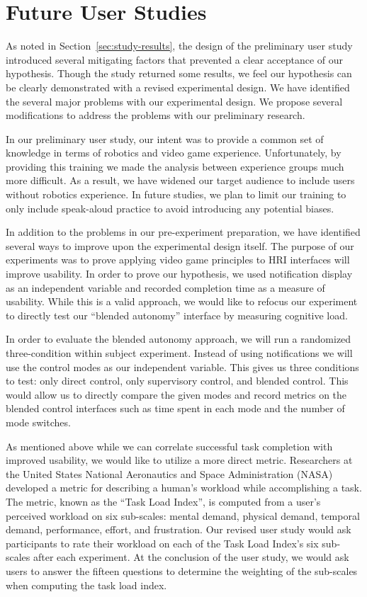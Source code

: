

\section{Future User Studies}
\label{sec:futurestudy}
As noted in Section~\ref{sec:study-results}, the design of the preliminary user study introduced several mitigating factors that prevented a clear acceptance of our hypothesis. Though the study returned some results, we feel our hypothesis can be clearly demonstrated with a revised experimental design. We have identified the several major problems with our experimental design. We propose several modifications to address the problems with our preliminary research.

In our preliminary user study, our intent was to provide a common set of knowledge in terms of robotics and video game experience. Unfortunately, by providing this training we made the analysis between experience groups much more difficult. As a result, we have widened our target audience to include users without robotics experience. In future studies, we plan to limit our training to only include speak-aloud practice to avoid introducing any potential biases.

In addition to the problems in our pre-experiment preparation, we have identified several ways to improve upon the experimental design itself. The purpose of our experiments was to prove applying video game principles to HRI interfaces will improve usability. In order to prove our hypothesis, we used notification display as an independent variable and recorded completion time as a measure of usability. While this is a valid approach, we would like to refocus our experiment to directly test our ``blended autonomy'' interface by measuring cognitive load. 

In order to evaluate the blended autonomy approach, we will run a randomized three-condition within subject experiment. Instead of using notifications we will use the control modes as our independent variable. This gives us three conditions to test: only direct control, only supervisory control, and blended control. This would allow us to directly compare the given modes and record metrics on the blended control interfaces such as time spent in each mode and the number of mode switches.

As mentioned above while we can correlate successful task completion with improved usability, we would like to utilize a more direct metric. Researchers at the United States National Aeronautics and Space Administration (NASA) developed a metric for describing a human's workload while accomplishing a task. The metric, known as the ``Task Load Index'', is computed from a user's perceived workload on six sub-scales: mental demand, physical demand, temporal demand, performance, effort, and frustration. \cite{NASA_TLX} Our revised user study would ask participants to rate their workload on each of the Task Load Index's six sub-scales after each experiment. At the conclusion of the user study, we would ask users to answer the fifteen questions to determine the weighting of the sub-scales when computing the task load index. \cite{NASA_TLX20}

